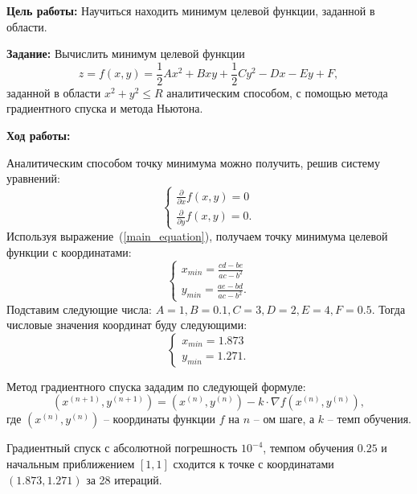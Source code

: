 \justifying
\textbf{Цель работы:}
Научиться находить минимум целевой функции, заданной в области.

\textbf{Задание:}
Вычислить минимум целевой функции
\begin{equation}\label{main_equation}
    z = f(x,y) = \frac{1}{2} A x ^ 2 + B x y + \frac{1}{2} C y ^ 2 - D x - E y + F,
\end{equation}
заданной в области $x ^ 2 + y ^ 2 \leq R$ аналитическим способом, с помощью метода градиентного спуска и метода Ньютона.

\textbf{Ход работы:}

Аналитическим способом точку минимума можно получить, решив систему уравнений:
\begin{equation}
    \begin{cases}
    \frac{\partial}{\partial x} f(x, y) = 0 \\
    \frac{\partial}{\partial y} f(x, y) = 0.
    \end{cases}
\end{equation}
Используя выражение~(\ref{main_equation}), получаем точку минимума целевой функции с координатами:
\begin{equation}
    \begin{cases}
    x_{min} = \frac{c d - b e}{a c - b ^ 2} \\
    y_{min} = \frac{a e - b d}{a c - b ^ 2}.
    \end{cases}
\end{equation}
Подставим следующие числа: $A = 1, B = 0.1, C = 3, D = 2, E = 4, F = 0.5$. Тогда числовые значения координат буду следующими:
\begin{equation}
    \begin{cases}
    x_{min} = 1.873 \\
    y_{min} = 1.271.
    \end{cases}
\end{equation}

Метод градиентного спуска зададим по следующей формуле:
\begin{equation}
    (x^{(n + 1)}, y^{(n + 1)}) = (x^{(n)}, y^{(n)}) - k \cdot \nabla f(x^{(n)}, y^{(n)}),
\end{equation}
где $(x^{(n)}, y^{(n)})$ -- координаты функции $f$ на $n$ -- ом шаге, а $k$ -- темп обучения.

Градиентный спуск с абсолютной погрешность $10^{-4}$, темпом обучения $0.25$ и начальным приближением $[1, 1]$ сходится к точке с координатами $(1.873, 1.271)$ за 28 итераций.


